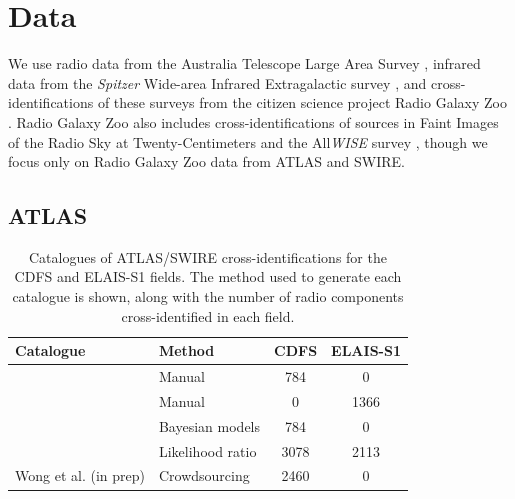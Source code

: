 \section{Data}\label{sec:atlas-xid-data}

  We use radio data from the Australia Telescope Large Area Survey
  \citep[ATLAS;][]{norris06,franzen15}, infrared data from the \emph{Spitzer}
  Wide-area Infrared Extragalactic survey \citep[SWIRE;][]{lonsdale03swire,
  surace05swire}, and cross-identifications of these surveys from the citizen
  science project Radio Galaxy Zoo \citep{banfield15}. Radio Galaxy Zoo also
  includes cross-identifications of sources in Faint Images of the Radio Sky at
  Twenty-Centimeters \citep[FIRST;][]{white97first} and the All\emph{WISE}
  survey \citep{cutri2013wiseexplanatory}, though we focus only on Radio
  Galaxy Zoo data from ATLAS and SWIRE.

  \subsection{ATLAS}\label{sec:atlas-xid-atlas}
    \begin{table}
      \caption[Catalogues of ATLAS/SWIRE cross-identifications for the CDFS
        and ELAIS-S1 fields.]{Catalogues of ATLAS/SWIRE cross-identifications for the CDFS
        and ELAIS-S1 fields. The method used to generate each catalogue is
        shown, along with the number of radio components cross-identified in each
        field.}
      \label{tab:atlas-cids}
      \begin{tabular}{llcc}
        \hline
        Catalogue & Method & CDFS & ELAIS-S1\\
        \hline
        \citet{norris06} & Manual & 784 & 0\\
        \citet{middelberg08} & Manual & 0 & 1366\\
        \citet{fan15} & Bayesian models & 784 & 0\\
        \citet{weston18lrpy} & Likelihood ratio & 3078 & 2113\\
        Wong et al. (in prep) & Crowdsourcing & 2460 & 0 \\
        \hline
      \end{tabular}
    \end{table}


